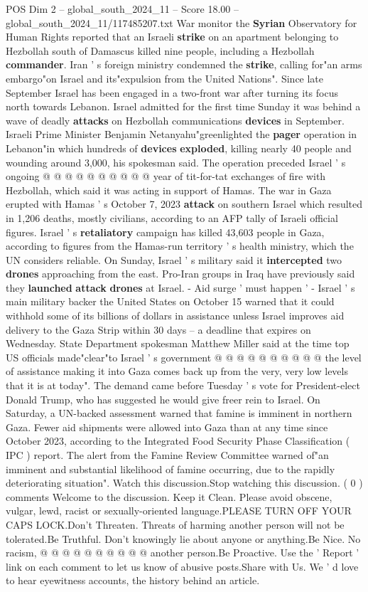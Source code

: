 \begin{textsample}{POS Dim 2 – global\_south\_2024\_11 – Score 18.00 – global\_south\_2024\_11/117485207.txt}
War monitor the \textbf{Syrian} Observatory for Human Rights reported that an Israeli \textbf{strike} on an apartment belonging to Hezbollah south of Damascus killed nine people, including a Hezbollah \textbf{commander}.
Iran ' s foreign ministry condemned the \textbf{strike}, calling for"an arms embargo"on Israel and its"expulsion from the United Nations".
Since late September Israel has been engaged in a two-front war after turning its focus north towards Lebanon.
Israel admitted for the first time Sunday it was behind a wave of deadly \textbf{attacks} on Hezbollah communications \textbf{devices} in September.
Israeli Prime Minister Benjamin Netanyahu"greenlighted the \textbf{pager} operation in Lebanon"in which hundreds of \textbf{devices} \textbf{exploded}, killing nearly 40 people and wounding around 3,000, his spokesman said.
The operation preceded Israel ' s ongoing @ @ @ @ @ @ @ @ @ @ year of tit-for-tat exchanges of fire with Hezbollah, which said it was acting in support of Hamas.
The war in Gaza erupted with Hamas ' s October 7, 2023 \textbf{attack} on southern Israel which resulted in 1,206 deaths, mostly civilians, according to an AFP tally of Israeli official figures.
Israel ' s \textbf{retaliatory} campaign has killed 43,603 people in Gaza, according to figures from the Hamas-run territory ' s health ministry, which the UN considers reliable.
On Sunday, Israel ' s military said it \textbf{intercepted} two \textbf{drones} approaching from the east.
Pro-Iran groups in Iraq have previously said they \textbf{launched} \textbf{attack} \textbf{drones} at Israel. - Aid surge ' must happen ' - Israel ' s main military backer the United States on October 15 warned that it could withhold some of its billions of dollars in assistance unless Israel improves aid delivery to the Gaza Strip within 30 days -- a deadline that expires on Wednesday.
State Department spokesman Matthew Miller said at the time top US officials made"clear"to Israel ' s government @ @ @ @ @ @ @ @ @ @ the level of assistance making it into Gaza comes back up from the very, very low levels that it is at today".
The demand came before Tuesday ' s vote for President-elect Donald Trump, who has suggested he would give freer rein to Israel.
On Saturday, a UN-backed assessment warned that famine is imminent in northern Gaza.
Fewer aid shipments were allowed into Gaza than at any time since October 2023, according to the Integrated Food Security Phase Classification ( IPC ) report.
The alert from the Famine Review Committee warned of"an imminent and substantial likelihood of famine occurring, due to the rapidly deteriorating situation".
Watch this discussion.Stop watching this discussion. ( 0 ) comments Welcome to the discussion.
Keep it Clean.
Please avoid obscene, vulgar, lewd, racist or sexually-oriented language.PLEASE TURN OFF YOUR CAPS LOCK.Don't Threaten.
Threats of harming another person will not be tolerated.Be Truthful.
Don't knowingly lie about anyone or anything.Be Nice.
No racism, @ @ @ @ @ @ @ @ @ @ another person.Be Proactive.
Use the ' Report ' link on each comment to let us know of abusive posts.Share with Us.
We ' d love to hear eyewitness accounts, the history behind an article.


\end{textsample}

